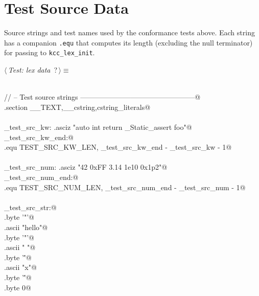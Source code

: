 \documentclass[11pt,a4paper,twoside,openright,DIV=15]{scrbook}
\theoremstyle{definition}
\theoremstyle{plain}
\theoremstyle{remark}
\begin{document}
\section{Test Source Data}

Source strings and test names used by the conformance tests above.
Each string has a companion \texttt{.equ} that computes its length
(excluding the null terminator) for passing to \texttt{kcc\_lex\_init}.

\begin{flushleft} \small
\begin{minipage}{\linewidth}\label{scrap84}\raggedright\small
{} $\langle\,${\itshape Test: lex data}\nobreak\ {\footnotesize {?}}$\,\rangle\equiv$
\vspace{-1ex}
\begin{list}{}{} \item
\mbox{}\verb@@\\
\mbox{}\verb@// -- Test source strings ------------------------------------------------@\\
\mbox{}\verb@.section __TEXT,__cstring,cstring_literals@\\
\mbox{}\verb@@\\
\mbox{}\verb@_test_src_kw:       .asciz "auto int return _Static_assert foo"@\\
\mbox{}\verb@_test_src_kw_end:@\\
\mbox{}\verb@.equ TEST_SRC_KW_LEN, _test_src_kw_end - _test_src_kw - 1@\\
\mbox{}\verb@@\\
\mbox{}\verb@_test_src_num:      .asciz "42 0xFF 3.14 1e10 0x1p2"@\\
\mbox{}\verb@_test_src_num_end:@\\
\mbox{}\verb@.equ TEST_SRC_NUM_LEN, _test_src_num_end - _test_src_num - 1@\\
\mbox{}\verb@@\\
\mbox{}\verb@_test_src_str:@\\
\mbox{}\verb@    .byte '"'@\\
\mbox{}\verb@    .ascii "hello"@\\
\mbox{}\verb@    .byte '"'@\\
\mbox{}\verb@    .ascii " "@\\
\mbox{}\verb@    .byte '\''@\\
\mbox{}\verb@    .ascii "x"@\\
\mbox{}\verb@    .byte '\''@\\
\mbox{}\verb@    .byte 0@\\

\end{list}
\end{minipage}
\end{flushleft}
\end{document}
